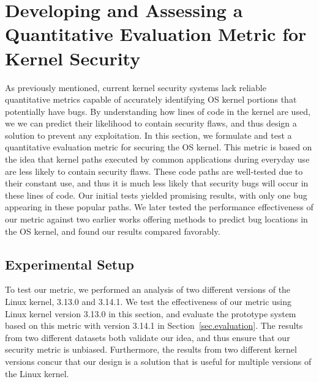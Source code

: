 \section{Developing and Assessing a Quantitative Evaluation Metric for Kernel Security}
\label{sec.metric}

As previously mentioned, current kernel
security systems lack reliable quantitative metrics capable of
 accurately identifying OS kernel portions that potentially have
bugs. By understanding how lines of code in the kernel are used, we
we can predict their likelihood to contain security flaws, and thus
design a solution to prevent any exploitation.
In this section, we formulate and test
a quantitative evaluation metric for securing the OS kernel.
This metric is based on the idea that kernel paths executed by common applications
during everyday use are less likely to contain security flaws.
These code paths are well-tested due to their constant use, and
thus it is much less likely that security bugs will occur in these lines of code.
Our initial tests yielded promising results, with only one
bug appearing in these popular paths.  We later tested the performance effectiveness
of our metric against two earlier works offering methods to predict bug
locations in the OS kernel, and found our results compared favorably.

\subsection{Experimental Setup}\label{sec-setup}
To test our metric, we performed an analysis of two different versions of
the Linux kernel, 3.13.0 and 3.14.1.
We test the effectiveness of our metric using Linux kernel version 3.13.0 in this
section, and evaluate the prototype system based on this metric with version 3.14.1 in
Section~\ref{sec.evaluation}. The results from two different datasets both validate
our idea, and thus ensure that our security metric is unbiased. Furthermore,
the results from two different kernel versions concur that our design is
a solution that is useful for multiple versions of the Linux kernel.

